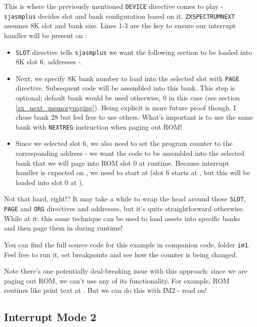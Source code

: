 This is where the previously mentioned {\tt DEVICE} directive comes to play - {\tt sjasmplus} decides slot and bank configuration based on it. {\tt ZXSPECTRUMNEXT} assumes 8K slot and bank size. Lines 1-3 are the key to ensure our interrupt handler will be present on :

\begin{itemize}
	\item {\tt SLOT} directive tells {\tt sjasmplus} we want the following section to be loaded into 8K slot 6, addresses -.
	
	\item Next, we specify 8K bank number to load into the selected slot with {\tt PAGE} directive. Subsequent code will be assembled into this bank. This step is optional; default bank would be used otherwise, 0 in this case (see section \ref{zx_next_memorypaging}). Being explicit is more future proof though. I chose bank 28 but feel free to use others. What's important is to use the same bank with {\tt NEXTREG} instruction when paging out ROM!
	
	\item Since we selected slot 6, we also need to set the program counter to the corresponding address - we want the code to be assembled into the selected bank that we will page into ROM slot 0 at runtime. Because interrupt handler is expected on , we need to start at  (slot 6 starts at , but this will be loaded into slot 0 at ).
\end{itemize}

Not that hard, right!? It may take a while to wrap the head around those {\tt SLOT}, {\tt PAGE} and {\tt ORG} directives and addresses, but it's quite straightforward otherwise. While at it: this same technique can be used to load assets into specific banks and then page them in during runtime!

You can find the full source code for this example in companion code, folder {\tt im1}. Feel free to run it, set breakpoints and see how the counter is being changed.

Note there's one potentially deal-breaking issue with this approach: since we are paging out ROM, we can't use any of its functionality. For example, ROM routines like print text at . But we can do this with IM2 - read on!


\subsection{Interrupt Mode 2}


